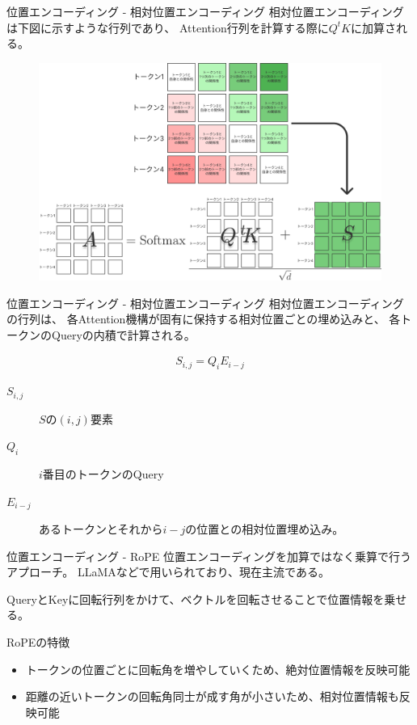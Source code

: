\documentclass[dvipdfm]{beamer}
\begin{document}
    \begin{frame}{位置エンコーディング - 相対位置エンコーディング}
        相対位置エンコーディングは下図に示すような行列であり、
        Attention行列を計算する際に$Q^t\!K$に加算される。
        \begin{figure}[h]
            \centering
            \includegraphics[width=.8\linewidth]{relative.pdf}
        \end{figure}
    \end{frame}
    \begin{frame}{位置エンコーディング - 相対位置エンコーディング}
        相対位置エンコーディングの行列は、
        各Attention機構が固有に保持する相対位置ごとの埋め込みと、
        各トークンのQueryの内積で計算される。
        \begin{block}{}
            \begin{align*}
                S_{i,j} = Q_iE_{i-j}
            \end{align*}

            \begin{description}
                \item[$S_{i,j}$] $S$の$(i,j)$要素
                \item[$Q_i$] $i$番目のトークンのQuery
                \item[$E_{i-j}$] {
                    あるトークンとそれから$i-j$の位置との相対位置埋め込み。
                }
            \end{description}
        \end{block}
    \end{frame}
    \begin{frame}{位置エンコーディング - RoPE}
        位置エンコーディングを加算ではなく乗算で行うアプローチ。
        LLaMAなどで用いられており、現在主流である。

        QueryとKeyに回転行列をかけて、ベクトルを回転させることで位置情報を乗せる。

        \begin{block}{RoPEの特徴}
            \begin{itemize}
                \item トークンの位置ごとに回転角を増やしていくため、絶対位置情報を反映可能
                \item 距離の近いトークンの回転角同士が成す角が小さいため、相対位置情報も反映可能
            \end{itemize}
        \end{block}
    \end{frame}
\end{document}
